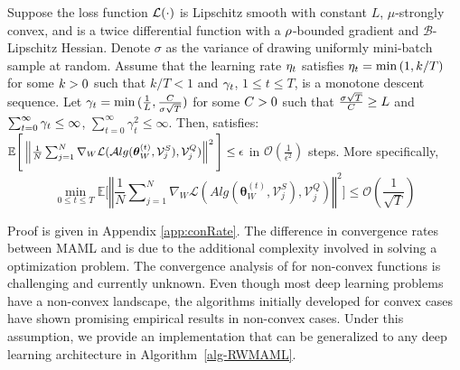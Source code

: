 \begin{theorem}
\label{meta-validation-convergence}
Suppose the loss function $\small \mathcal{L}(\cdot)$ is Lipschitz smooth with constant $L$, $\mu$-strongly convex, and is a twice differential function with a $\small \rho$-bounded gradient and $\mathcal{B}$-Lipschitz Hessian. Denote $\sigma$ as the variance of drawing uniformly mini-batch sample at random. Assume that the learning rate $\small \eta_t$ satisfies $\small \eta_t = \min{(1, k/T)}$ for some $ \small k>0$ such that $k/T < 1$ and $\small \gamma_t$, $1 \leq t \leq T$, is a monotone descent sequence. Let $\small \gamma_t = \min{(\frac{1}{L}, \frac{C}{\sigma \sqrt{T}})}$ for some $\small C > 0$ such that $\small \frac{\sigma\sqrt{T}}{C} \geq L$ and $ \small \sum_{t = 0}^{\infty}\gamma_t \leq \infty$, $\sum_{t = 0}^{\infty}\gamma_t^2 \leq \infty$. Then, \sysname{} satisfies: $\small \mathbb{E}\Bigg[\left\Vert\frac{1}{N}\sum_{j=1}^{N}\nabla_W\mathcal{L}(\mathcal{A}{lg}(\boldsymbol{\theta}_W^{(t)}, \mathcal{V}_j^S), \mathcal{V}_j^Q)\right\Vert^2\Bigg] \leq \epsilon$ in $\mathcal{O}(\frac{1}{\epsilon^2})$ steps. More specifically,
\begin{equation*}
\min_{0 \leq t \le T}\mathbb{E}\Bigg[\left\Vert\frac{1}{N}\sum\nolimits_{j=1}^{N}\nabla_W\mathcal{L}(\textit{Alg}(\boldsymbol{\theta}_W^{(t)}, \mathcal{V}_j^S), \mathcal{V}_j^Q)\right\Vert^2\Bigg] \leq \mathcal{O}(\frac{1}{\sqrt{T}})
\end{equation*}
\end{theorem}
Proof is given in Appendix \ref{app:conRate}. %
The difference in convergence rates between MAML and \sysname{} is due to the additional complexity involved in solving a \textit{\biopt{}} optimization problem. The convergence analysis of \sysname{} for non-convex functions is challenging and currently unknown. Even though most deep learning problems have a non-convex landscape, the algorithms initially developed for convex cases have shown promising empirical results in non-convex cases. Under this assumption, we provide an implementation that can be generalized to any deep learning architecture in Algorithm~\ref{alg-RWMAML}. 

